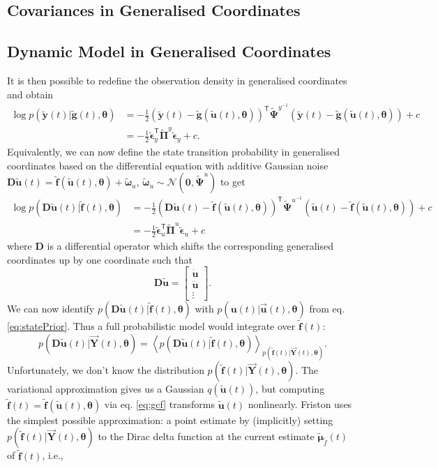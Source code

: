 \documentclass[a4paper,10pt]{article}
\newcommand{\bs}[1]{\mathbf{#1}}					%
\newcommand{\bgs}[1]{\boldsymbol{#1}}				%
\newcommand{\tr}{\mathsf{T}}				%
\newcommand{\eq}[1]{\begin{equation} #1 \end{equation}}%
\newcommand{\gc}[1]{\tilde{#1}} %
\renewcommand{\ss}{u}         %
\newcommand{\so}{y}         %
\newcommand{\spe}{\epsilon} %
\renewcommand{\sp}{\theta}    %
\newcommand{\ps}{\bs{\ss}}    %
\newcommand{\po}{\bs{\so}}    %
\newcommand{\ppe}{\bgs{\spe}} %
\newcommand{\psg}{\gc{\ps}}    %
\newcommand{\pog}{\gc{\po}}    %
\newcommand{\ppeg}{\gc{\ppe}} %
\newcommand{\pp}{\bgs{\sp}} %
\newcommand{\Po}{\bs{Y}}    %
\newcommand{\D}{\bs{D}}				%
\newcommand{\E}[2][]{\left\langle #2 \right\rangle_{#1}}	%
\newcommand{\N}{\mathcal{N}}			%
\begin{document}
\subsection{Covariances in Generalised Coordinates}


\subsection{Dynamic Model in Generalised Coordinates}
It is then possible to redefine the observation density in generalised coordinates and obtain
\begin{align}
    \log p(\pog(t)|\gc{\bs{g}}(t),\pp) &= -\frac{1}{2}(\pog(t) - \gc{\bs{g}}(\psg(t),\pp))^\tr\gc{\bgs{\Psi}}^{\so^{-1}}(\pog(t) - \gc{\bs{g}}(\psg(t),\pp)) + c\\
    &= -\frac{1}{2}\ppeg_\so^\tr\gc{\bgs{\Pi}}^{\so}\ppeg_\so + c.
\end{align}
Equivalently, we can now define the state transition probability in generalised coordinates based on the differential equation with additive Gaussian noise $\D\psg(t) = \gc{\bs{f}}(\psg(t),\pp)+\gc{\bgs{\omega}}_\ss$, $\gc{\bgs{\omega}}_\ss\sim \N(\bs{0},\gc{\bgs{\Psi}}^\ss)$ to get
\begin{align}
    \log p(\D\psg(t)|\gc{\bs{f}}(t),\pp) &= -\frac{1}{2}(\D\psg(t) - \gc{\bs{f}}(\psg(t),\pp))^\tr\gc{\bgs{\Psi}}^{\ss^{-1}}(\psg(t) - \gc{\bs{f}}(\psg(t),\pp)) + c\\
    &= -\frac{1}{2}\ppeg_\ss^\tr\gc{\bgs{\Pi}}^{\ss}\ppeg_\ss + c
\end{align}
where $\D$ is a differential operator which shifts the corresponding generalised coordinates up by one coordinate such that
\eq{
    \D\psg = \left[\begin{array}{c} \dot{\ps}\\ \ddot{\ps}\\ \vdots \end{array}\right].
}
We can now identify $p(\D\psg(t)|\gc{\bs{f}}(t),\pp)$ with $p(\ps(t)|\vec{\ps}(t),\pp)$ from eq. \eqref{eq:statePrior}. Thus a full probabilistic model would integrate over $\gc{\bs{f}}(t)$:
\eq{
    p(\D\psg(t)|\vec{\Po}(t),\pp) = \E[p(\gc{\bs{f}}(t)|\vec{\Po}(t),\pp)]{p(\D\psg(t)|\gc{\bs{f}}(t),\pp)}.
}
Unfortunately, we don't know the distribution $p(\gc{\bs{f}}(t)|\vec{\Po}(t),\pp)$. The variational approximation gives us a Gaussian $q(\psg(t))$, but computing $\gc{\bs{f}}(t) = \gc{\bs{f}}(\psg(t),\pp)$ via eq. \eqref{eq:gcf} transforms $\psg(t)$ nonlinearly. Friston uses the simplest possible approximation: a point estimate by (implicitly) setting $p(\gc{\bs{f}}(t)|\vec{\Po}(t),\pp)$ to the Dirac delta function at the current estimate $\gc{\bgs{\mu}}_{\gc{f}}(t)$ of $\gc{\bs{f}}(t)$, i.e.,
\end{document}
